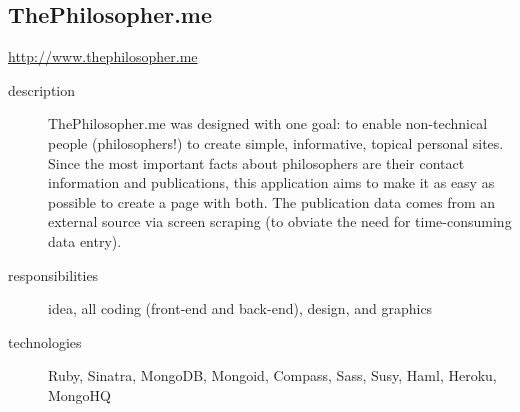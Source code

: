 \documentclass{article}
\begin{document}
\subsection{ThePhilosopher.me} %
\label{sub:ThePhilosopher}

\begin{multicols}{2}
\href{http://www.thephilosopher.me}{http://www.thephilosopher.me}

\begin{description}
  \item[description] ThePhilosopher.me was designed with one goal: to 
    enable non-technical people (philosophers!) to create simple, 
    informative, topical personal sites.  Since the most important 
    facts about philosophers are their contact information and 
    publications, this application aims to make it as easy as possible 
    to create a page with both.  The publication data comes from an 
    external source via screen scraping (to obviate the need for 
    time-consuming data entry).
  \item[responsibilities] idea, all coding (front-end and back-end), 
    design, and graphics
  \item[technologies] Ruby, Sinatra, MongoDB, Mongoid, Compass, Sass, 
    Susy, Haml, Heroku, MongoHQ
\end{description}

\vfill
\columnbreak
{}
\end{multicols}
\end{document}
